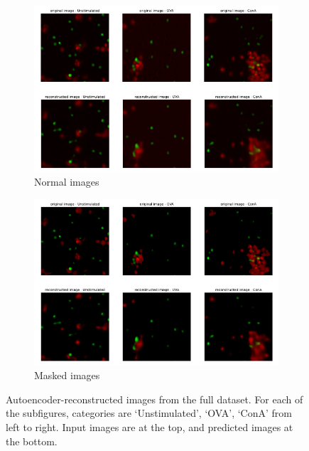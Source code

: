 \begin{figure}[h!]
    \centering
    \begin{subfigure}[h!]{0.45\textwidth}
        \includegraphics[width=\textwidth]{dissertation/figures/CK19_reconstruction.png}
        \caption{Normal images}
    \end{subfigure}
    \begin{subfigure}[h!]{0.45\textwidth}
        \includegraphics[width=\textwidth]{dissertation/figures/CK19_masked_reconstruction.png}
        \caption{Masked images}
    \end{subfigure}
    \caption{Autoencoder-reconstructed images from the full dataset. For each of the subfigures, categories are `Unstimulated', `OVA', `ConA' from left to right. Input images are at the top, and predicted images at the bottom.}
    \label{fig:my_label}
\end{figure}

